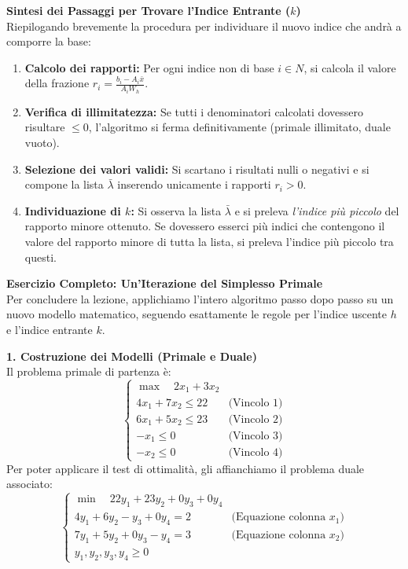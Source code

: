 \documentclass[12pt, a4paper]{article}
\begin{document}
	\vspace{0.4cm}
	\textbf{Sintesi dei Passaggi per Trovare l'Indice Entrante ($k$)}\\
	Riepilogando brevemente la procedura per individuare il nuovo indice che andrà a comporre la base:
	\begin{enumerate}
		\item \textbf{Calcolo dei rapporti:} Per ogni indice non di base $i \in N$, si calcola il valore della frazione $r_i = \frac{b_i - A_i \bar{x}}{A_i W_h}$.
		\item \textbf{Verifica di illimitatezza:} Se tutti i denominatori calcolati dovessero risultare $\leq 0$, l'algoritmo si ferma definitivamente (primale illimitato, duale vuoto).
		\item \textbf{Selezione dei valori validi:} Si scartano i risultati nulli o negativi e si compone la lista $\bar{\lambda}$ inserendo unicamente i rapporti $r_i > 0$.
		\item \textbf{Individuazione di $k$:} Si osserva la lista $\bar{\lambda}$ e si preleva \textit{l'indice più piccolo} del rapporto minore ottenuto. Se dovessero esserci più indici che contengono il valore del rapporto minore di tutta la lista, si preleva l'indice più piccolo tra questi.
	\end{enumerate}
	
	\vspace{0.6cm}
	\textbf{Esercizio Completo: Un'Iterazione del Simplesso Primale}\\
	Per concludere la lezione, applichiamo l'intero algoritmo passo dopo passo su un nuovo modello matematico, seguendo esattamente le regole per l'indice uscente $h$ e l'indice entrante $k$.
	
	\textbf{1. Costruzione dei Modelli (Primale e Duale)}\\
	Il problema primale di partenza è:
	\[
	\begin{cases}
		\max \quad 2x_1 + 3x_2 \\[6pt]
		4x_1 + 7x_2 \leq 22 \quad &\text{(Vincolo 1)} \\
		6x_1 + 5x_2 \leq 23 \quad &\text{(Vincolo 2)} \\
		-x_1 \leq 0 \quad &\text{(Vincolo 3)} \\
		-x_2 \leq 0 \quad &\text{(Vincolo 4)}
	\end{cases}
	\]
	Per poter applicare il test di ottimalità, gli affianchiamo il problema duale associato:
	\[
	\begin{cases}
		\min \quad 22y_1 + 23y_2 + 0y_3 + 0y_4 \\[6pt]
		4y_1 + 6y_2 - y_3 + 0y_4 = 2 \quad &\text{(Equazione colonna } x_1) \\
		7y_1 + 5y_2 + 0y_3 - y_4 = 3 \quad &\text{(Equazione colonna } x_2) \\[6pt]
		y_1, y_2, y_3, y_4 \geq 0
	\end{cases}
	\]
	
\end{document}
